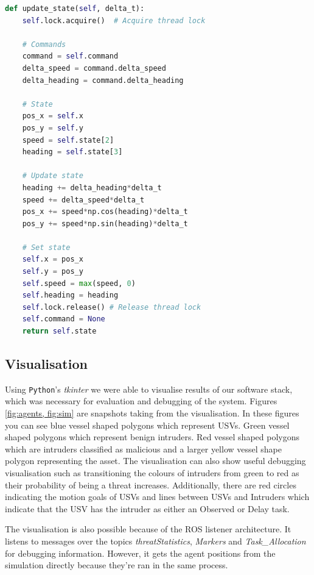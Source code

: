 \documentclass[bsc,frontabs,twoside,singlespacing,parskip,deptreport]{infthesis}     %
\begin{document}
\begin{lstlisting}[language=Python, caption=kinematic update for an agent in the simulation, label=code:sim]
def update_state(self, delta_t):
    self.lock.acquire()  # Acquire thread lock
    
    # Commands
    command = self.command
    delta_speed = command.delta_speed
    delta_heading = command.delta_heading

    # State
    pos_x = self.x
    pos_y = self.y
    speed = self.state[2]
    heading = self.state[3]

    # Update state
    heading += delta_heading*delta_t
    speed += delta_speed*delta_t
    pos_x += speed*np.cos(heading)*delta_t
    pos_y += speed*np.sin(heading)*delta_t

    # Set state
    self.x = pos_x
    self.y = pos_y
    self.speed = max(speed, 0)
    self.heading = heading
    self.lock.release() # Release thread lock
    self.command = None
    return self.state
\end{lstlisting}

\subsection{Visualisation}
Using \texttt{Python}'s \emph{tkinter} we were able to visualise results of our software stack, which was necessary for evaluation and debugging of the system. Figures \ref{fig:agents, fig:sim} are snapshots taking from the visualisation. In these figures you can see blue vessel shaped polygons which represent USVs. Green vessel shaped polygons which represent benign intruders. Red vessel shaped polygons which are intruders classified as malicious and a larger yellow vessel shape polygon representing the asset. The visualisation can also show useful debugging visualisation such as transitioning the colours of intruders from green to red as their probability of being a threat increases. Additionally, there are red circles indicating the motion goals of USVs and lines between USVs and Intruders which indicate that the USV has the intruder as either an Observed or Delay task.

The visualisation is also possible because of the ROS listener architecture. It listens to messages over the topics \emph{threatStatistics}, \emph{Markers} and \emph{Task\_Allocation} for debugging information. However, it gets the agent positions from the simulation directly because they're ran in the same process. 
\end{document}
